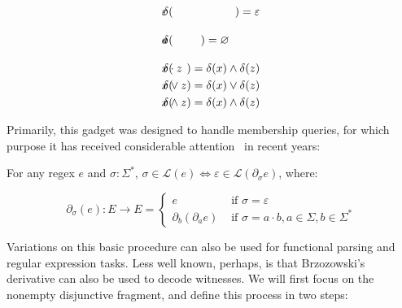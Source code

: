 \documentclass[sigplan,review,acmsmall,nonacm,screen,anonymous]{acmart}\settopmatter{printfolios=false,printccs=false,printacmref=false}
\begin{document}
\begin{definition}[Brzozowski, 1964]
\begin{multicols}{2}
\begin{eqnarray*}
      \delta(&\hspace{-0.35cm} \varepsilon \hspace{-0.35cm}&) = \varepsilon                                      \\
      \delta(&\hspace{-0.35cm} a           \hspace{-0.35cm}&) = \varnothing\phantom{\begin{cases}\varepsilon\\\varnothing\end{cases}}\\
      \delta(&\hspace{-0.35cm} x\cdot z    \hspace{-0.35cm}&) = \delta(x) \land \delta(z)                        \\
      \delta(&\hspace{-0.35cm} x\vee  z    \hspace{-0.35cm}&) = \delta(x) \vee  \delta(z)                        \\
      \delta(&\hspace{-0.35cm} x\land z    \hspace{-0.35cm}&) = \delta(x) \land \delta(z)
    \end{eqnarray*}
  \end{multicols}
\end{definition}

Primarily, this gadget was designed to handle membership queries, for which purpose it has received considerable attention~\cite{might2011parsing,stanford2021symbolic,varatalu2025re} in recent years:

\begin{theorem}[Recognition]
  For any regex \(e\) and \(\sigma: \Sigma^*\), \(\sigma \in \mathcal{L}(e) \Longleftrightarrow \varepsilon \in \mathcal{L}(\partial_\sigma e)\), where:

  \[
    \partial_\sigma (e): E \rightarrow E = \begin{cases}e &\text{ if } \sigma = \varepsilon\\\partial_b(\partial_a e) &\text{ if } \sigma = a \cdot b, a \in \Sigma, b \in \Sigma^* \end{cases}
  \]
\end{theorem}

Variations on this basic procedure can also be used for functional parsing and regular expression tasks. Less well known, perhaps, is that Brzozowski's derivative can also be used to decode witnesses. We will first focus on the nonempty disjunctive fragment, and define this process in two steps:
\end{document}
